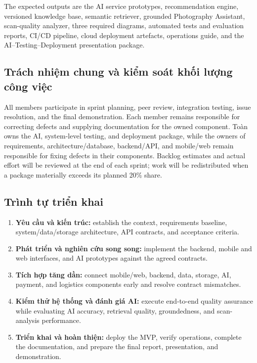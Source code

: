 The expected outputs are the AI service prototypes, recommendation engine,
versioned knowledge base, semantic retriever, grounded Photography Assistant,
scan-quality analyzer, three required diagrams, automated tests and evaluation
reports, CI/CD pipeline, cloud deployment artefacts, operations guide, and the
AI--Testing--Deployment presentation package.

\subsection*{Trách nhiệm chung và kiểm soát khối lượng công việc}

All members participate in sprint planning, peer review, integration testing,
issue resolution, and the final demonstration. Each member remains responsible
for correcting defects and supplying documentation for the owned component.
Toàn owns the AI, system-level testing, and deployment package, while the owners
of requirements, architecture/database, backend/API, and mobile/web remain
responsible for fixing defects in their components. Backlog estimates and actual
effort will be reviewed at the end of each sprint; work will be redistributed
when a package materially exceeds its planned 20\% share.

\subsection*{Trình tự triển khai}

\begin{enumerate}
	\item \textbf{Yêu cầu và kiến trúc:} establish the context, requirements
	baseline, system/data/storage architecture, API contracts, and acceptance
	criteria.
	\item \textbf{Phát triển và nghiên cứu song song:} implement the backend,
	mobile and web interfaces, and AI prototypes against the agreed contracts.
	\item \textbf{Tích hợp tăng dần:} connect mobile/web, backend, data, storage,
	AI, payment, and logistics components early and resolve contract mismatches.
	\item \textbf{Kiểm thử hệ thống và đánh giá AI:} execute end-to-end quality
	assurance while evaluating AI accuracy, retrieval quality, groundedness, and
	scan-analysis performance.
	\item \textbf{Triển khai và hoàn thiện:} deploy the MVP, verify operations,
	complete the documentation, and prepare the final report, presentation, and
	demonstration.
\end{enumerate}

